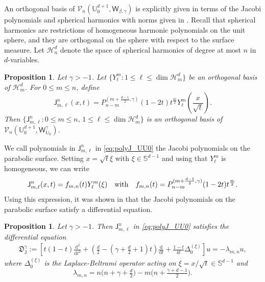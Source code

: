 \documentclass{amsart}
\newtheorem{prop}[thm]{Proposition}
\theoremstyle{remark}
\def\la{{\langle}}
\def\ra{{\rangle}}
\def\d{\mathrm{d}}
\def\sph{{\mathbb{S}^{d-1}}}
\def\sh{{\mathsf h}}
\def\sJ{{\mathsf J}}
\def\sP{{\mathsf P}}
\def\sQ{{\mathsf Q}}
\def\sW{{\mathsf W}}
\def\fD{{\mathfrak D}}
\def\b{{\beta}}
\def\g{{\gamma}}
\def\l{{\lambda}}
\def\la{{\langle}}
\def\ra{{\rangle}}
\def\CH{{\mathcal H}}
\def\CV{{\mathcal V}}
\def\UU{{\mathbb U}}
\def\f{\frac}
\begin{document}
An orthogonal basis of $\CV_n(\UU_0^{d+1}, \sW_{\b,\g})$ is explicitly given in terms of the Jacobi polynomials 
and spherical harmonics \cite{OX} with norms given in \cite[Prop. 3.1]{X23a}. Recall that spherical harmonics 
are restrictions of homogeneous harmonic polynomials on the unit sphere, and they are orthogonal on the sphere
with respect to the surface measure. Let $\CH_n^d$ denote the space of spherical harmonics of degree at most $n$ in 
$d$-variables. 

\begin{prop}
Let $\g > -1$. Let $\{Y_\ell^m: 1 \le \ell \le \dim \CH_m^d\}$ be an orthogonal basis of $\CH_m^d$. 
For $0 \le m \le n$, define  
\begin{equation} \label{eq:polyJ_UU0}
   \sJ_{m,\ell}^n(x,t) = P_{n-m}^{(m +\frac{d-1}{2},\g)}(1-2 t) t^{\f{m}{2}}Y_\ell^m\left(\f{x}{\sqrt{t}}\right). 
\end{equation}
Then $\{\sJ_{m,\ell}^n: 0\le m \le n, \, 1 \le \ell \le \dim \CH_m^d\}$ is an orthogonal basis of 
$\CV_n(\UU_0^{d+1}, \sW_{\UU_0}^\g)$.  
\end{prop}

We call polynomials in $\sJ_{m,\ell}^n$ in \eqref{eq:polyJ_UU0} the Jacobi polynomials on the parabolic surface. 
Setting $x = \sqrt{t} \xi$ with $\xi \in \sph$ and using that $Y_\ell^m$ is homogeneous, we can write
$$
  \sJ_{m,\ell}^n (x,t) = f_{m,n}(t) Y_\ell^m(\xi) \quad \hbox{with}\quad f_{m,n}(t) = P_{n-m}^{(m +\frac{d-1}{2},\g)}(1-2 t) t^{\f{m}{2}}.
$$
Using this expression, it was shown in \cite[Prop. 3.2]{X23a} that the Jacobi polynomials on the parabolic surface
satisfy a differential equation.
 
\begin{prop}\label{prp:pde}
Let $\g > -1$. Then $\sJ_{m,\ell}^n$ in \eqref{eq:polyJ_UU0} satisfies the differential equation
\begin{align}\label{eq:J_U0_diff}
 \fD_\sJ^{\g}  :=  \left[   t (1-t) \frac{\d^2}{\d t^2} +\left(\tfrac{d}{2} - (\g + \tfrac{d}2 + 1)t \right) \frac{\d}{\d t} + \frac{1-t}{4 t} \Delta_0^{(\xi)}
    \right] u = - \l_{m,n} u,
\end{align}
where $\Delta_0^{(\xi)}$ is the Laplace-Beltrami operator acting on $\xi = x/\sqrt{t} \in \sph$ and
$$
  \l_{m,n}  =  n \big( n+\g + \tfrac{d}{2}\big) - m \big(n + \tfrac{\g + d-1}{2}\big).   
$$
\end{prop}
\end{document}
